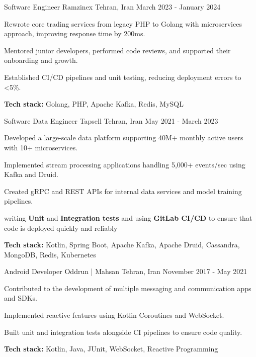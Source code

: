 \begin{cventries}
    
  \cventry
    {Software Engineer} %
    {Ramzinex} %
    {Tehran, Iran} %
    {March 2023 - January 2024} %
    {
      \begin{cvitems} %
        \item Rewrote core trading services from legacy PHP to Golang with microservices approach, improving response time by 200ms.
        \item Mentored junior developers, performed code reviews, and supported their onboarding and growth.
        \item Established CI/CD pipelines and unit testing, reducing deployment errors to <5\%.
        \item \textbf{Tech stack:} Golang, PHP, Apache Kafka, Redis, MySQL
      \end{cvitems}
    }

    \cventry
    {Software Data Engineer} %
    {Tapsell} %
    {Tehran, Iran} %
    {May 2021 - March 2023} %
    {
      \begin{cvitems} %
        \item Developed a large-scale data platform supporting 40M+ monthly active users with 10+ microservices.
        \item Implemented stream processing applications handling 5,000+ events/sec using Kafka and Druid.
        \item Created gRPC and REST APIs for internal data services and model training pipelines.
        \item writing \textbf{Unit} and \textbf{Integration tests} and using \textbf{GitLab CI/CD} to ensure that code is deployed quickly and reliably
        \item \textbf{Tech stack:} Kotlin, Spring Boot, Apache Kafka, Apache Druid, Cassandra, MongoDB, Redis, Kubernetes
      \end{cvitems}
    }

    \cventry
    {Android Developer} %
    {Oddrun | Mahsan} %
    {Tehran, Iran} %
    {November 2017 - May 2021} %
    {
      \begin{cvitems} %
        \item Contributed to the development of multiple messaging and communication apps and SDKs.
        \item Implemented reactive features using Kotlin Coroutines and WebSocket.
        \item Built unit and integration tests alongside CI pipelines to ensure code quality.
        \item \textbf{Tech stack:} Kotlin, Java, JUnit, WebSocket, Reactive Programming
      \end{cvitems}
    }

\end{cventries}
